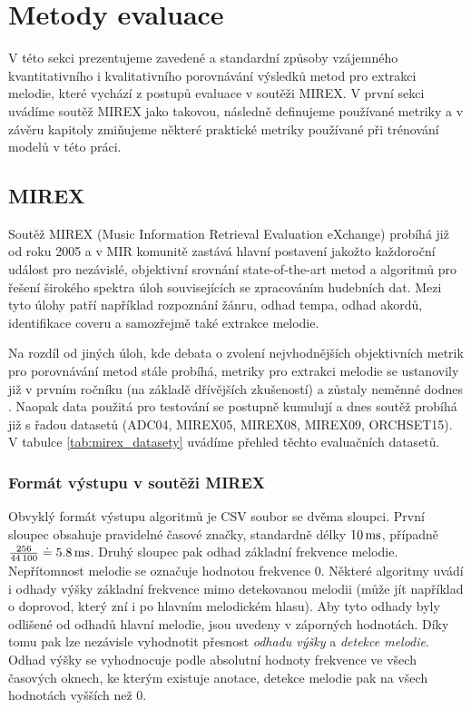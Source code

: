 \chapter{Metody evaluace}\label{cha:evaluace}

V této sekci prezentujeme zavedené a standardní způsoby vzájemného kvantitativního i kvalitativního porovnávání výsledků metod pro extrakci melodie, které vychází z postupů evaluace v soutěži MIREX. V první sekci uvádíme soutěž MIREX jako takovou, následně definujeme používané metriky a v závěru kapitoly zmiňujeme některé praktické metriky používané při trénování modelů v této práci.

\section{MIREX}

Soutěž MIREX (Music Information Retrieval Evaluation eXchange) probíhá již od roku 2005 a v MIR komunitě zastává hlavní postavení jakožto každoroční událost pro nezávislé, objektivní srovnání state-of-the-art metod a algoritmů pro řešení širokého spektra úloh souvisejících se zpracováním hudebních dat. Mezi tyto úlohy patří například rozpoznání žánru, odhad tempa, odhad akordů, identifikace coveru a samozřejmě také extrakce melodie.

Na rozdíl od jiných úloh, kde debata o zvolení nejvhodnějších objektivních metrik pro porovnávání metod stále probíhá, metriky pro extrakci melodie se ustanovily již v prvním ročníku (na základě dřívějších zkušeností) a zůstaly neměnné dodnes \citep{Raffel2014}. Naopak data použitá pro testování se postupně kumulují a dnes soutěž probíhá již s řadou datasetů (ADC04, MIREX05, MIREX08, MIREX09, ORCHSET15). V tabulce \ref{tab:mirex_datasety} uvádíme přehled těchto evaluačních datasetů.

\subsection{Formát výstupu v soutěži MIREX}

Obvyklý formát výstupu algoritmů je CSV soubor se dvěma sloupci. První sloupec obsahuje pravidelné časové značky, standardně délky $10\,\rm ms$, případně $\frac{256}{44\,100} \doteq 5.8 \,\rm ms$. Druhý sloupec pak odhad základní frekvence melodie. Nepřítomnost melodie se označuje hodnotou frekvence 0. Některé algoritmy uvádí i odhady výšky základní frekvence mimo detekovanou melodii (může jít například o doprovod, který zní i po hlavním melodickém hlasu). Aby tyto odhady byly odlišené od odhadů hlavní melodie, jsou uvedeny v záporných hodnotách. Díky tomu pak lze nezávisle vyhodnotit přesnost \textit{odhadu výšky} a \textit{detekce melodie}. Odhad výšky se vyhodnocuje podle absolutní hodnoty frekvence ve všech časových oknech, ke kterým existuje anotace, detekce melodie pak na všech hodnotách vyšších než 0. 

